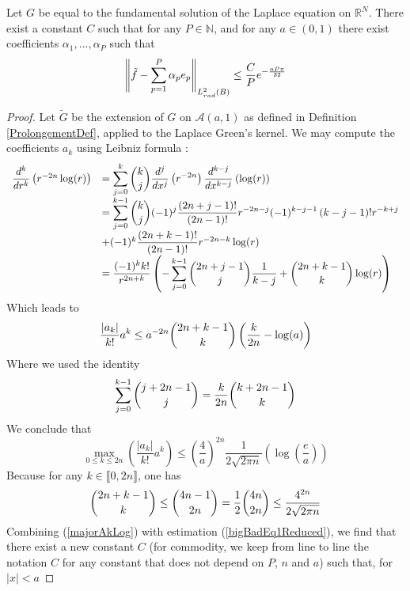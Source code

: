 \documentclass[11pt,a4paper]{article}
\begin{document}
\begin{The} Let $G$ be equal to the fundamental solution of the Laplace equation on $\mathbb{R}^N$. There exist a constant $C$ such that for any $P \in \mathbb{N}$, and for any $a \in (0,1)$ there exist coefficients $\alpha_1,...,\alpha_{P}$ such that
\[ \left\|\tilde{f} - \sum_{p=1}^{P}\alpha_p e_p\right\|_{L^2_{rad}(B)} \leq \frac{C}{P} e^{-\frac{aP\pi}{32}}\]

\begin{proof}
Let $\tilde{G}$ be the extension of $G$ on $\mathcal{A}(a,1)$ as defined in Definition \ref{ProlongementDef}, applied to the Laplace Green's kernel. We may compute the coefficients $a_k$ using Leibniz formula : 
\[\begin{array}{rl}

\dfrac{d^k }{dr^k}\left(r^{-2n}\log(r)\right) &= \displaystyle\sum_{j=0}^k\dbinom{k}{j}\dfrac{d^j}{dx^j}\left(r^{-2n}\right)\dfrac{d^{k-j}}{dx^{k-j}}\left(\log(r)\right)\\
&= \displaystyle\sum_{j=0}^{k-1} \dbinom{k}{j}(-1)^j \dfrac{(2n+j-1)!}{(2n-1)!}r^{-2n-j}(-1)^{k-j-1}\left(k-j-1\right)!r^{-k+j}\\ & + (-1)^k \dfrac{(2n+k-1)!}{(2n-1)!}r^{-2n-k}\log(r)\\
& = \dfrac{(-1)^k k!}{r^{2n+k}} \left(-\displaystyle\sum_{j=0}^{k-1}\dbinom{2n+j-1}{j}\dfrac{1}{k-j}+\dbinom{2n+k-1}{k}\log(r)\right)
\end{array}\]
Which leads to \[\dfrac{|a_k|}{k!}a^k \leq a^{-2n} \dbinom{2n + k -1}{k}\left(\frac{k}{2n}-\log(a)\right)\]
Where we used the identity 
\begin{equation}
\sum_{j=0}^{k-1}\dbinom{j+2n-1}{j} = \dfrac{k}{2n}\dbinom{k+2n-1}{k}
\label{sommekparmminplusk}
\end{equation}
We conclude that \begin{equation}
\max_{0\leq k \leq 2n}\left(\dfrac{|a_k|}{k!}a^k\right) \leq \left(\frac{4}{a}\right)^{2n}\dfrac{1}{2\sqrt{2\pi n}}\left(\log\left(\frac{e}{a}\right)\right)
\label{majorAkLog} 
\end{equation}
Because for any $k \in \llbracket 0,2n\rrbracket$, one has 
\begin{equation}
\dbinom{2n+k-1}{k}\leq \dbinom{4n-1}{2n} = \frac{1}{2}\dbinom{4n}{2n} \leq \dfrac{4^{2n}}{2\sqrt{2\pi n}}
\label{nparmi2n}
\end{equation}
Combining (\ref{majorAkLog}) with estimation (\ref{bigBadEq1Reduced}), we find that there exist a new constant $C$ (for commodity, we keep from line to line the notation $C$ for any constant that does not depend on $P$, $n$ and $a$) such that, for $|x|<a$

\end{proof}
\end{The}
\end{document}
